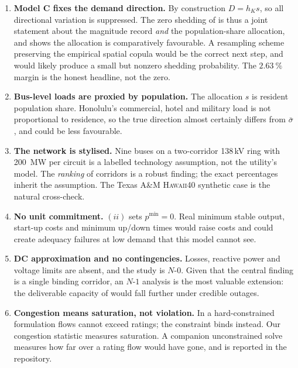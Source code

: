 \documentclass[11pt,a4paper]{article}
\theoremstyle{definition}
\theoremstyle{plain}
\theoremstyle{remark}
\begin{document}
\begin{enumerate}[label=\textbf{L\arabic*.},leftmargin=*,itemsep=0.35em]

\item \textbf{Model C fixes the demand direction.} By construction
$D = h_K s$, so all directional variation is suppressed. The zero shedding of
 is thus a joint statement about the magnitude record \emph{and}
the population-share allocation, and  shows the allocation is
comparatively favourable. A resampling scheme preserving the empirical spatial
copula would be the correct next step, and would likely produce a small but
nonzero shedding probability. The $\SI{2.63}{\percent}$ margin is the honest
headline, not the zero.

\item \textbf{Bus-level loads are proxied by population.} The allocation
$s$ is resident population share. Honolulu's commercial, hotel and military load
is not proportional to residence, so the true direction almost certainly differs
from $\bar\sigma$, and could be less favourable.

\item \textbf{The network is stylised.} Nine buses on a two-corridor
138\,kV ring with \SI{200}{\mega\watt} per circuit is a labelled technology
assumption, not the utility's model. The \emph{ranking} of corridors is a robust
finding; the exact percentages inherit the assumption. The Texas A\&M
\textsc{Hawaii40} synthetic case is the natural cross-check.

\item \textbf{No unit commitment.} $(ii)$ sets
$p^{\min} = 0$. Real minimum stable output, start-up costs and minimum up/down
times would raise costs and could create adequacy failures at low demand that
this model cannot see.

\item \textbf{DC approximation and no contingencies.} Losses, reactive power and
voltage limits are absent, and the study is $N$-$0$. Given that the central
finding is a single binding corridor, an $N$-$1$ analysis is the most valuable
extension: the deliverable capacity of  would fall further
under credible outages.

\item \textbf{Congestion means saturation, not violation.} In a hard-constrained
formulation flows cannot exceed ratings; the constraint binds instead. Our
congestion statistic measures saturation. A companion unconstrained solve
measures how far over a rating flow would have gone, and is reported in the
repository.
\end{enumerate}
\end{document}
